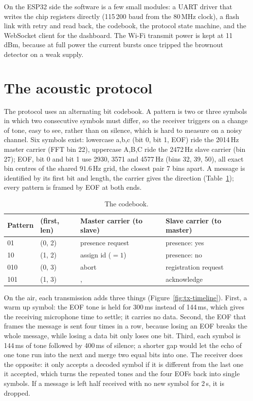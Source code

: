 \documentclass[a4paper,10pt]{article}
\begin{document}
On the ESP32 side the software is a few small modules: a UART driver that writes the chip
registers directly (115\,200 baud from the 80\,MHz clock), a flash link with retry and read
back, the codebook, the protocol state machine, and the WebSocket client for the dashboard.
The Wi-Fi transmit power is kept at 11\,dBm, because at full power the current bursts once
tripped the brownout detector on a weak supply.

\section{The acoustic protocol}
\label{sec:protocol}

The protocol uses an alternating bit codebook. A pattern is two or three
symbols in which two consecutive symbols must differ, so the receiver triggers on a
change of tone, easy to see, rather than on silence, which is hard to
measure on a noisy channel. Six symbols exist: lowercase a,b,c (bit 0,
bit 1, EOF) ride the 2014\,Hz master carrier (FFT bin 22), uppercase
A,B,C ride the 2472\,Hz slave carrier (bin 27); EOF, bit 0 and bit 1 use
2930, 3571 and 4577\,Hz (bins 32, 39, 50), all exact bin centres of the shared
$91.6$\,Hz grid, the closest pair 7 bins apart. A message is identified by its first
bit and length, the carrier gives the direction (Table~\ref{tab:codebook}); every
pattern is framed by EOF at both ends.

\begin{table}[H]
\centering
\caption{The codebook.}
\label{tab:codebook}
\small
\begin{tabular}{llll}
\toprule
\textbf{Pattern} & \textbf{(first, len)} & \textbf{Master carrier (to slave)} & \textbf{Slave carrier (to master)} \\
\midrule
01 & (0, 2) & presence request & presence: yes \\
10 & (1, 2) & assign id ($=1$) & presence: no \\
010 & (0, 3) & abort & registration request \\
101 & (1, 3) &, & acknowledge \\
\bottomrule
\end{tabular}
\end{table}

On the air, each transmission adds three things (Figure~\ref{fig:tx-timeline}). First, a
warm up symbol: the EOF tone is held for 300\,ms instead of 144\,ms, which gives the
receiving microphone time to settle; it carries no data. Second, the EOF that frames the
message is sent four times in a row, because losing an EOF breaks the whole message, while
losing a data bit only loses one bit. Third, each symbol is 144\,ms of tone followed by
400\,ms of silence; a shorter gap would let the echo of one tone run into the next and merge
two equal bits into one. The receiver does the opposite: it only accepts a decoded symbol if
it is different from the last one it accepted, which turns the repeated tones and the four
EOFs back into single symbols. If a message is left half received with no new symbol for
2\,s, it is dropped.
\end{document}
